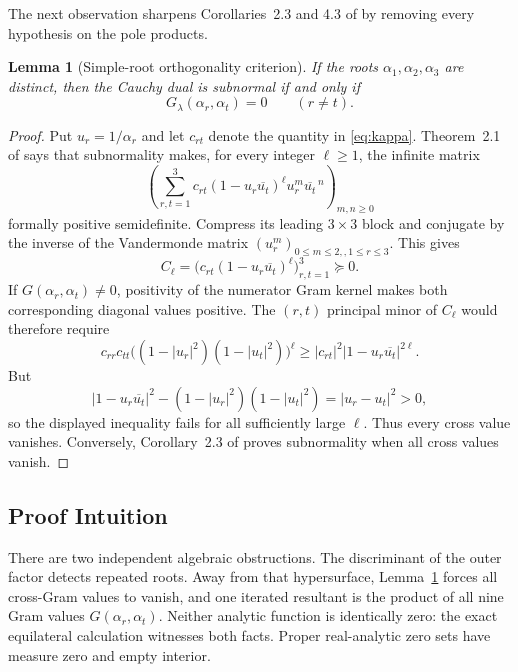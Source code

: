 \documentclass[11pt]{article}
\newtheorem{lemma}[theorem]{Lemma}
\begin{document}
The next observation sharpens Corollaries~2.3 and 4.3 of \cite{CGR} by
removing every hypothesis on the pole products.

\begin{lemma}[Simple-root orthogonality criterion]\label{lem:orthogonality}
If the roots $\alpha_1,\alpha_2,\alpha_3$ are distinct, then the Cauchy dual
is subnormal if and only if
\begin{equation}\label{eq:crosszero}
 G_\lambda(\alpha_r,\alpha_t)=0\qquad(r\ne t).
\end{equation}
\end{lemma}

\begin{proof}
Put $u_r=1/\alpha_r$ and let $c_{rt}$ denote the quantity in
\eqref{eq:kappa}.  Theorem~2.1 of \cite{CGR} says that subnormality makes,
for every integer $\ell\ge1$, the infinite matrix
\[
 \left(\sum_{r,t=1}^3 c_{rt}
 (1-u_r\overline{u_t})^\ell u_r^m\overline{u_t}^{\,n}
 \right)_{m,n\ge0}
\]
formally positive semidefinite.  Compress its leading $3\times3$ block and
conjugate by the inverse of the Vandermonde matrix
$(u_r^m)_{0\le m\le2,,1\le r\le3}$.  This gives
\[
 C_\ell=\big(c_{rt}(1-u_r\overline{u_t})^\ell\big)_{r,t=1}^3\succeq0.
\]
If $G(\alpha_r,\alpha_t)\ne0$, positivity of the numerator Gram kernel makes
both corresponding diagonal values positive.  The $(r,t)$ principal minor
of $C_\ell$ would therefore require
\[
 c_{rr}c_{tt}\big((1-|u_r|^2)(1-|u_t|^2)\big)^\ell
 \ge |c_{rt}|^2|1-u_r\overline{u_t}|^{2\ell}.
\]
But
\[
 |1-u_r\overline{u_t}|^2
 -(1-|u_r|^2)(1-|u_t|^2)=|u_r-u_t|^2>0,
\]
so the displayed inequality fails for all sufficiently large $\ell$.
Thus every cross value vanishes.  Conversely, Corollary~2.3 of \cite{CGR}
proves subnormality when all cross values vanish.
\end{proof}

\subsection*{Proof Intuition}

There are two independent algebraic obstructions.  The discriminant of the
outer factor detects repeated roots.  Away from that hypersurface,
Lemma~\ref{lem:orthogonality} forces all cross-Gram values to vanish, and one
iterated resultant is the product of all nine Gram values
$G(\alpha_r,\alpha_t)$.  Neither analytic function is identically zero: the
exact equilateral calculation witnesses both facts.  Proper real-analytic
zero sets have measure zero and empty interior.
\end{document}
